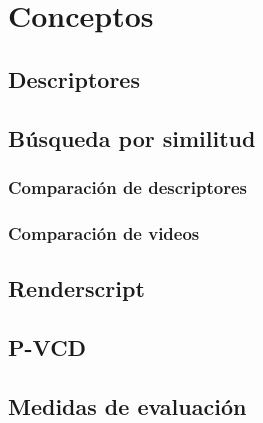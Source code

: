 \chapter{Conceptos}
\section{Descriptores}
\section{Búsqueda por similitud}
\subsection{Comparación de descriptores}
\subsection{Comparación de videos}
\section{Renderscript}
\section{P-VCD}
\section{Medidas de evaluación}

\lipsum[50-60]